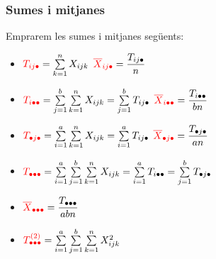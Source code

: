 \documentclass[12pt,t]{beamer}
\newcommand{\red}[1]{\textcolor{red}{#1}}
\theoremstyle{plain}
\theoremstyle{definition}
\begin{document}
\begin{frame}
\frametitle{Sumes i mitjanes}
\vspace*{-2ex}

Emprarem les sumes i mitjanes següents:

\begin{itemize}
\item $\red{T_{ij\bullet}}=\sum\limits_{k=1}^n X_{ijk}$\qquad \qquad\qquad\hspace*{3.1ex} 
 $\red{\overline{X}_{ij\bullet}}=\dfrac{T_{ij\bullet}}{n}$
 \medskip

\item  $\red{T_{i\bullet\bullet}}=\sum\limits_{j=1}^b\sum\limits_{k=1}^n X_{ijk}=\sum\limits_{j=1}^b T_{ij\bullet}$\qquad    
$\red{\overline{X}_{i\bullet\bullet}}=\dfrac{T_{i\bullet\bullet}}{bn}$
\medskip

\item $\red{T_{\bullet j\bullet}}=\sum\limits_{i=1}^a\sum\limits_{k=1}^n X_{ijk}=\sum\limits_{i=1}^a T_{ij\bullet}$\qquad   
$\red{\overline{X}_{\bullet j\bullet}}=\dfrac{T_{\bullet j\bullet}}{an}$
\medskip

\item $\red{T_{\bullet\bullet\bullet}}=\sum\limits_{i=1}^{a}\sum\limits_{j=1}^b\sum\limits_{k=1}^n X_{ijk}=\sum\limits_{i=1}^{a}
T_{i\bullet\bullet}=\sum\limits_{j=1}^b T_{\bullet j\bullet}$\medskip

\item  $\red{\overline{X}_{\bullet\bullet\bullet}}=\dfrac{T_{\bullet\bullet\bullet}}{a b n}$\medskip


\item $\red{T^{(2)}_{\bullet\bullet\bullet}}=\sum\limits_{i=1}^{a}\sum\limits_{j=1}^b\sum\limits_{k=1}^n X_{ijk}^2$\medskip

\end{itemize}
\end{frame}
\end{document}
